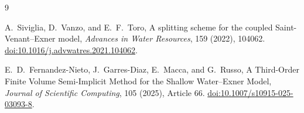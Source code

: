 \documentclass[11pt]{article}
\begin{document}
\begin{thebibliography}{9}

A.~Siviglia, D.~Vanzo, and E.~F.~Toro,
\newblock A splitting scheme for the coupled Saint-Venant--Exner model,
\newblock \emph{Advances in Water Resources}, 159 (2022), 104062.
\newblock \href{https://doi.org/10.1016/j.advwatres.2021.104062}{doi:10.1016/j.advwatres.2021.104062}.

E.~D.~Fernandez-Nieto, J.~Garres-Diaz, E.~Macca, and G.~Russo,
\newblock A Third-Order Finite Volume Semi-Implicit Method for the Shallow Water--Exner Model,
\newblock \emph{Journal of Scientific Computing}, 105 (2025), Article 66.
\newblock \href{https://doi.org/10.1007/s10915-025-03093-8}{doi:10.1007/s10915-025-03093-8}.

\end{thebibliography}
\end{document}
